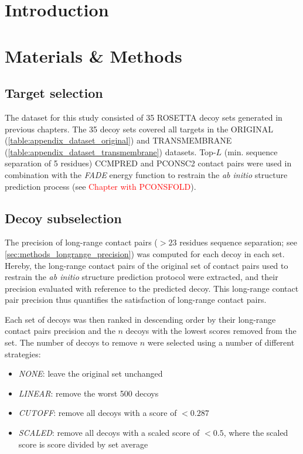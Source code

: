 \section{Introduction}

\section{Materials \& Methods}
\subsection{Target selection}
The dataset for this study consisted of 35 ROSETTA decoy sets generated in previous chapters. The 35 decoy sets covered all targets in the ORIGINAL (\cref{table:appendix_dataset_original}) and TRANSMEMBRANE (\cref{table:appendix_dataset_transmembrane}) datasets. Top-$L$ (min. sequence separation of 5 residues) CCMPRED \cite{Seemayer2014-zp} and PCONSC2 \cite{Skwark2014-qp} contact pairs were used in combination with the \textit{FADE} energy function to restrain the \textit{ab initio} structure prediction process (see \textcolor{red}{Chapter with PCONSFOLD}).

\subsection{Decoy subselection}
The precision of long-range contact pairs ($>23$ residues sequence separation; see \cref{sec:methods_longrange_precision}) was computed for each decoy in each set. Hereby, the long-range contact pairs of the original set of contact pairs used to restrain the \textit{ab initio} structure prediction protocol were extracted, and their precision evaluated with reference to the predicted decoy. This long-range contact pair precision thus quantifies the satisfaction of long-range contact pairs.

Each set of decoys was then ranked in descending order by their long-range contact pairs precision and the $n$ decoys with the lowest scores removed from the set. The number of decoys to remove $n$ were selected using a number of different strategies:

\begin{itemize}
    \item \textit{NONE}: leave the original set unchanged
    \item \textit{LINEAR}: remove the worst 500 decoys
    \item \textit{CUTOFF}: remove all decoys with a score of $<0.287$ 
    \item \textit{SCALED}: remove all decoys with a scaled score of $<0.5$, where the scaled score is score divided by set average
\end{itemize}

